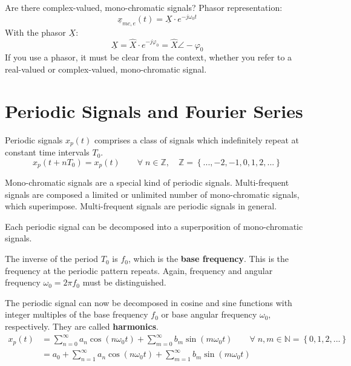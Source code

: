 \begin{refsection}
\begin{excursus}{Are there complex-valued, mono-chromatic signals?}
	\vspace{0.5em}
	Phasor representation:
	\begin{equation}
		\underline{x}_{mc,e}(t) = \underline{X} \cdot e^{- j \omega_0 t}
	\end{equation}
	With the phasor $\underline{X}$:
	\begin{equation}
		\underline{X} = \hat{X} \cdot e^{- j \varphi_0} =  \hat{X} \angle -\varphi_0
	\end{equation}
	If you use a phasor, it must be clear from the context, whether you refer to a real-valued or complex-valued, mono-chromatic signal.
\end{excursus}

\section{Periodic Signals and Fourier Series}

Periodic signals $x_p(t)$ comprises a class of signals which indefinitely repeat at constant time intervals $T_0$.
\begin{equation}
	x_p(t + n T_0) = x_p(t) \qquad \forall \; n \in \mathbb{Z}, \quad \mathbb{Z} = \left\{..., -2, -1, 0, 1, 2, ...\right\}
\end{equation}%
%

Mono-chromatic signals are a special kind of periodic signals. Multi-frequent signals are composed a limited or unlimited number of mono-chromatic signals, which superimpose. Multi-frequent signals are periodic signals in general.

\begin{fact}
	Each periodic signal can be decomposed into a superposition of mono-chromatic signals.
\end{fact}

The inverse of the period $T_0$ is $f_0$, which is the \textbf{base frequency}. This is the frequency at the periodic pattern repeats. Again, frequency and angular frequency $\omega_0 = 2 \pi f_0$ must be distinguished.

The periodic signal can now be decomposed in cosine and sine functions with integer multiples of the base frequency $f_0$ or base angular frequency $\omega_0$, respectively. They are called  \textbf{harmonics}.
\begin{equation}
	\begin{split}
		x_p(t) &= \sum\limits_{n=0}^{\infty} a_n \cos\left(n \omega_0 t\right) + \sum\limits_{m=0}^{\infty} b_m \sin\left(m \omega_0 t\right) \qquad \forall \; n, m \in \mathbb{N} = \left\{0, 1, 2, ...\right\} \\
		 &= a_0 + \sum\limits_{n=1}^{\infty} a_n \cos\left(n \omega_0 t\right) + \sum\limits_{m=1}^{\infty} b_m \sin\left(m \omega_0 t\right) \\
	\end{split}
	\label{eq:ch02:fourier_series}
\end{equation}


\end{refsection}
